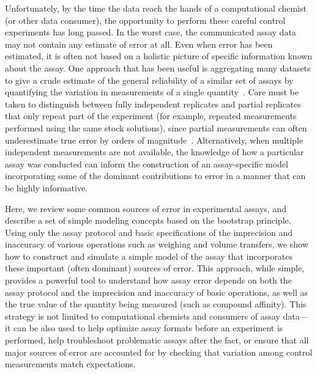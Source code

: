 \documentclass[aps,pre,twocolumn,nofootinbib,superscriptaddress,linenumbers]{revtex4-1}
\begin{document}
Unfortunately, by the time the data reach the hands of a computational chemist (or other data consumer), the opportunity to perform these careful control experiments has long passed.
In the worst case, the communicated assay data may not contain any estimate of error at all. 
Even when error has been estimated, it is often not based on a holistic picture of specific information known about the assay.
One approach that has been useful is aggregating many datasets to give a crude estimate of the general reliability of a similar set of assays by quantifying the variation in measurements of a single quantity~\cite{kramer_experimental_2012,kalliokoski_comparability_2013}. 
Care must be taken to distinguish between fully independent replicates and partial replicates that only repeat part of the experiment (for example, repeated measurements performed using the same stock solutions), since partial measurements can often underestimate true error by orders of magnitude~\cite{chodera_entropy-enthalpy_2013}.
Alternatively, when multiple independent measurements are not available, the knowledge of how a particular assay was conducted can inform the construction of an assay-specific model incorporating some of the dominant contributions to error in a manner that can be highly informative.

Here, we review some common sources of error in experimental assays, and describe a set of simple modeling concepts based on the bootstrap principle.
Using only the assay protocol and basic specifications of the imprecision and inaccuracy of various operations such as weighing and volume transfers, we show how to construct and simulate a simple model of the assay that incorporates these important (often dominant) sources of error. 
This approach, while simple, provides a powerful tool to understand how assay error depends on both the assay protocol and the imprecision and inaccuracy of basic operations, as well as the true value of the quantity being measured (such as compound affinity). 
This strategy is not limited to computational chemists and consumers of assay data---it can be also used to help optimize assay formats before an experiment is performed, help troubleshoot problematic assays after the fact, or ensure that all major sources of error are accounted for by checking that variation among control measurements match expectations.
\end{document}
